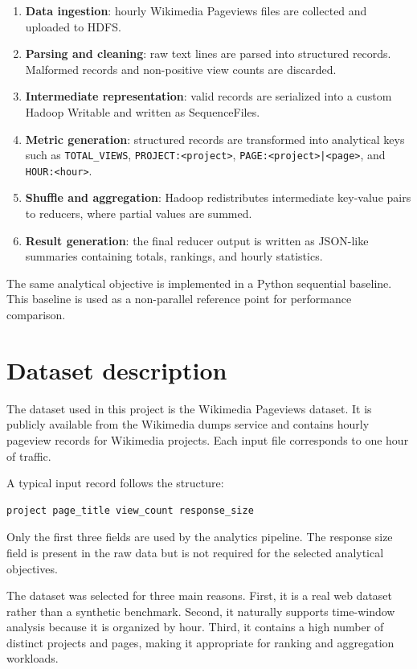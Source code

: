 \documentclass[12pt,a4paper]{report}
\begin{document}
\begin{enumerate}
    \item \textbf{Data ingestion}: hourly Wikimedia Pageviews files are collected and uploaded to HDFS.
    \item \textbf{Parsing and cleaning}: raw text lines are parsed into structured records. Malformed records and non-positive view counts are discarded.
    \item \textbf{Intermediate representation}: valid records are serialized into a custom Hadoop Writable and written as SequenceFiles.
    \item \textbf{Metric generation}: structured records are transformed into analytical keys such as \texttt{TOTAL\_VIEWS}, \texttt{PROJECT:<project>}, \texttt{PAGE:<project>|<page>}, and \texttt{HOUR:<hour>}.
    \item \textbf{Shuffle and aggregation}: Hadoop redistributes intermediate key-value pairs to reducers, where partial values are summed.
    \item \textbf{Result generation}: the final reducer output is written as JSON-like summaries containing totals, rankings, and hourly statistics.
\end{enumerate}

The same analytical objective is implemented in a Python sequential baseline. This baseline is used as a non-parallel reference point for performance comparison.

\chapter{Dataset description}

The dataset used in this project is the Wikimedia Pageviews dataset. It is publicly available from the Wikimedia dumps service and contains hourly pageview records for Wikimedia projects. Each input file corresponds to one hour of traffic.

A typical input record follows the structure:

\begin{verbatim}
project page_title view_count response_size
\end{verbatim}

Only the first three fields are used by the analytics pipeline. The response size field is present in the raw data but is not required for the selected analytical objectives.

The dataset was selected for three main reasons. First, it is a real web dataset rather than a synthetic benchmark. Second, it naturally supports time-window analysis because it is organized by hour. Third, it contains a high number of distinct projects and pages, making it appropriate for ranking and aggregation workloads.
\end{document}
